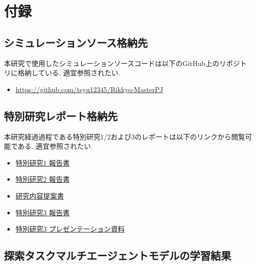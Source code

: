 \appendix
\chapter*{付録}
\section{シミュレーションソース格納先}
本研究で使用したシミュレーションソースコードは以下のGitHub上のリポジトリに格納している. 適宜参照されたい.
\begin{itemize}
  \item \url{https://github.com/tsyu12345/Rikkyo-MasterPJ}
\end{itemize}
\section{特別研究レポート格納先}
本研究経過過程である特別研究1/2および3のレポートは以下のリンクから閲覧可能である. 適宜参照されたい.
\begin{itemize}
  \item \href{https://drive.google.com/open?id=1cAxzPoKxxjQKVu29GLQ0nsldmYBtgDEn&usp=drive_fs}{特別研究1 報告書}
  \item \href{https://drive.google.com/open?id=14rU8VHIF_2HHVoE2twPA_s9i6qF9QqlJ&usp=drive_fs}{特別研究2 報告書}
  \item \href{https://drive.google.com/open?id=1cJ8v32mS4TthynS6yP99nYb8Sv3YQPLZ&usp=drive_fs}{研究内容提案書}
  \item \href{https://drive.google.com/open?id=1cLeL2UJFi6_QtMtjGqVr22aTDtoGnCT5&usp=drive_fs}{特別研究3 報告書}
  \item \href{https://drive.google.com/open?id=14ub9oX1HVd4acJh_h1ov97LJCkNjIwnq&usp=drive_fs}{特別研究3 プレゼンテーション資料}
\end{itemize}

\section{探索タスクマルチエージェントモデルの学習結果}
